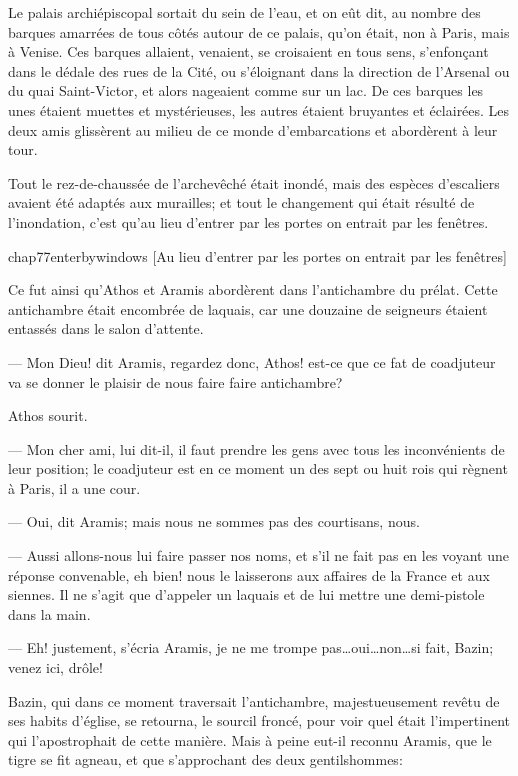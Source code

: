 Le palais archiépiscopal sortait du sein de l'eau, et on eût dit, au nombre des barques amarrées de tous côtés autour de ce palais, qu'on était, non à Paris, mais à Venise. Ces barques allaient, venaient, se croisaient en tous sens, s'enfonçant dans le dédale des rues de la Cité, ou s'éloignant dans la direction de l'Arsenal ou du quai Saint-Victor, et alors nageaient comme sur un lac. De ces barques les unes étaient muettes et mystérieuses, les autres étaient bruyantes et éclairées. Les deux amis glissèrent au milieu de ce monde d'embarcations et abordèrent à leur tour.

Tout le rez-de-chaussée de l'archevêché était inondé, mais des espèces d'escaliers avaient été adaptés aux murailles; et tout le changement qui était résulté de l'inondation, c'est qu'au lieu d'entrer par les portes on entrait par les fenêtres.

\begin{bwbigpic}
	[\basicscale] 
	{chap77enterbywindows}
	[Au lieu d'entrer par les portes on entrait par les fenêtres]
\end{bwbigpic}

Ce fut ainsi qu'Athos et Aramis abordèrent dans l'antichambre du prélat. Cette antichambre était encombrée de laquais, car une douzaine de seigneurs étaient entassés dans le salon d'attente.

— Mon Dieu! dit Aramis, regardez donc, Athos! est-ce que ce fat de coadjuteur va se donner le plaisir de nous faire faire antichambre?

Athos sourit.

— Mon cher ami, lui dit-il, il faut prendre les gens avec tous les inconvénients de leur position; le coadjuteur est en ce moment un des sept ou huit rois qui règnent à Paris, il a une cour.

— Oui, dit Aramis; mais nous ne sommes pas des courtisans, nous.

— Aussi allons-nous lui faire passer nos noms, et s'il ne fait pas en les voyant une réponse convenable, eh bien! nous le laisserons aux affaires de la France et aux siennes. Il ne s'agit que d'appeler un laquais et de lui mettre une demi-pistole dans la main.

— Eh! justement, s'écria Aramis, je ne me trompe pas\dots oui\dots non\dots si fait, Bazin; venez ici, drôle!

Bazin, qui dans ce moment traversait l'antichambre, majestueusement revêtu de ses habits d'église, se retourna, le sourcil froncé, pour voir quel était l'impertinent qui l'apostrophait de cette manière. Mais à peine eut-il reconnu Aramis, que le tigre se fit agneau, et que s'approchant des deux gentilshommes:

